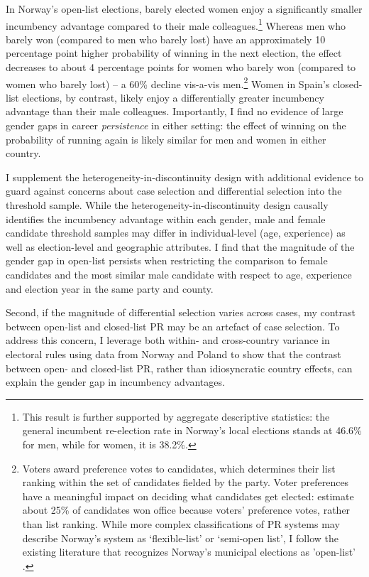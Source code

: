 \documentclass[12pt]{article}
\begin{document}
In Norway's open-list elections, barely elected women enjoy a significantly smaller incumbency advantage compared to their male colleagues.\footnote{This result is further supported by aggregate descriptive statistics: the general incumbent re-election rate in Norway's local elections stands at 46.6\% for men, while for women, it is 38.2\%.} Whereas men who barely won (compared to men who barely lost) have an approximately 10 percentage point higher probability of winning in the next election, the effect decreases to about 4 percentage points for women who barely won (compared to women who barely lost) -- a 60\% decline vis-a-vis men.\footnote{\label{fn:norway_system} Voters award preference votes to candidates, which determines their list ranking within the set of candidates fielded by the party. Voter preferences have a meaningful impact on deciding what candidates get elected: \citet{bergh2010} estimate about 25\% of candidates won office because voters' preference votes, rather than list ranking.
While more complex classifications of PR systems may describe Norway's system as `flexible-list' or `semi-open list', I follow the existing literature that recognizes Norway's municipal elections as 'open-list' \citep{fiva2018a, fiva2018b}.} Women in Spain's closed-list elections, by contrast, likely enjoy a differentially greater incumbency advantage than their male colleagues. Importantly, I find no evidence of large gender gaps in career \emph{persistence} in either setting: the effect of winning on the probability of running again is likely similar for men and women in either country.

I supplement the heterogeneity-in-discontinuity design with additional evidence to guard against concerns about case selection and differential selection into the threshold sample. While the heterogeneity-in-discontinuity design causally identifies the incumbency advantage within each gender, male and female candidate threshold samples may differ in individual-level (age, experience) as well as election-level and geographic attributes. I find that the magnitude of the gender gap in open-list persists when restricting the comparison to female candidates and the most similar male candidate with respect to age, experience and election year in the same party and county.

Second, if the magnitude of differential selection varies across cases, my contrast between open-list and closed-list PR may be an artefact of case selection. To address this concern, I leverage both within- and cross-country variance in electoral rules using data from Norway and Poland to show that the contrast between open- and closed-list PR, rather than idiosyncratic country effects, can explain the gender gap in incumbency advantages.
\end{document}
